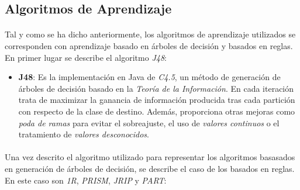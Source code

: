 \documentclass{article}
\begin{document}
		\subsection{Algoritmos de Aprendizaje}
		\label{sec:algorithms}

			\paragraph{}
			Tal y como se ha dicho anteriormente, los algoritmos de aprendizaje utilizados se corresponden con aprendizaje basado en árboles de decisión y basados en reglas. En primer lugar se describe el algoritmo \emph{J48}:

			\begin{itemize}
 				\item \textbf{J48}: Es la implementación en Java de \emph{C4.5}, un método de generación de árboles de decisión basado en la \emph{Teoría de la Información}. En cada iteración trata de maximizar la ganancia de información producida tras cada partición con respecto de la clase de destino. Además, proporciona otras mejoras como \emph{poda de ramas} para evitar el sobreajuste, el uso de \emph{valores continuos} o el tratamiento de \emph{valores desconocidos}.
			\end{itemize}

			\paragraph{}
			Una vez descrito el algoritmo utilizado para representar los algoritmos basasados en generación de árboles de decisión, se describe el caso de los basados en reglas. En este caso son \emph{1R}, \emph{PRISM}, \emph{JRIP} y \emph{PART}:
\end{document}
